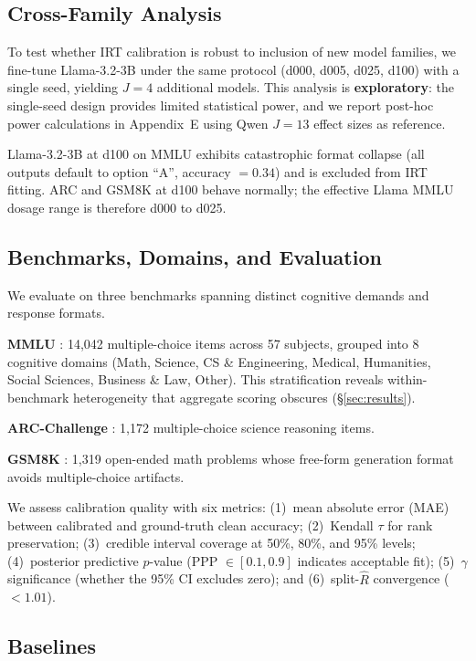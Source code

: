 \subsection{Cross-Family Analysis}
\label{sec:cross_family}

To test whether IRT calibration is robust to inclusion of new model families, we fine-tune Llama-3.2-3B under the same protocol (d000, d005, d025, d100) with a single seed, yielding $J=4$ additional models. This analysis is \textbf{exploratory}: the single-seed design provides limited statistical power, and we report post-hoc power calculations in Appendix~E using Qwen $J=13$ effect sizes as reference.

Llama-3.2-3B at d100 on MMLU exhibits catastrophic format collapse (all outputs default to option ``A'', accuracy $=0.34$) and is excluded from IRT fitting. ARC and GSM8K at d100 behave normally; the effective Llama MMLU dosage range is therefore d000 to d025.

\subsection{Benchmarks, Domains, and Evaluation}
\label{sec:benchmarks}

We evaluate on three benchmarks spanning distinct cognitive demands and response formats.

\textbf{MMLU} \citep{hendrycks2021mmlu}: 14,042 multiple-choice items across 57 subjects, grouped into 8 cognitive domains (Math, Science, CS \& Engineering, Medical, Humanities, Social Sciences, Business \& Law, Other). This stratification reveals within-benchmark heterogeneity that aggregate scoring obscures (\S\ref{sec:results}).

\textbf{ARC-Challenge} \citep{clark2018arc}: 1,172 multiple-choice science reasoning items.

\textbf{GSM8K} \citep{cobbe2021gsm8k}: 1,319 open-ended math problems whose free-form generation format avoids multiple-choice artifacts.

We assess calibration quality with six metrics: (1)~mean absolute error (MAE) between calibrated and ground-truth clean accuracy; (2)~Kendall $\tau$ for rank preservation; (3)~credible interval coverage at 50\%, 80\%, and 95\% levels; (4)~posterior predictive $p$-value (PPP $\in [0.1, 0.9]$ indicates acceptable fit); (5)~$\gamma$ significance (whether the 95\% CI excludes zero); and (6)~split-$\hat{R}$ convergence ($<1.01$).

\subsection{Baselines}
\label{sec:baselines}

